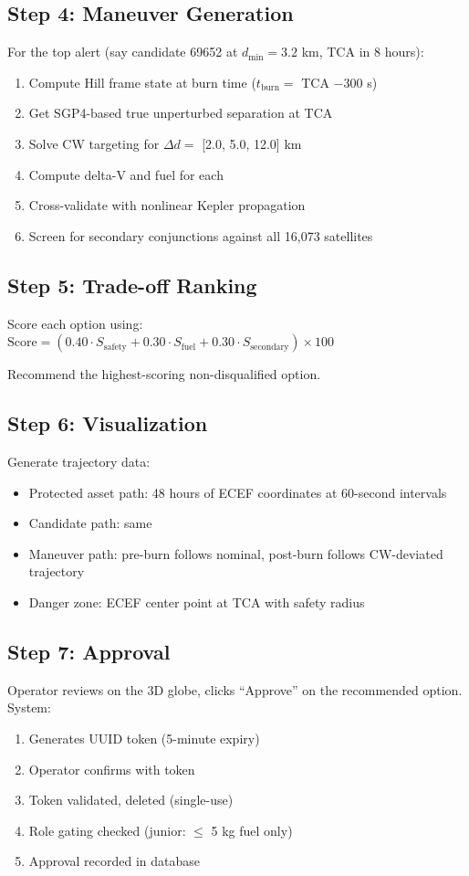 \documentclass[12pt,a4paper]{article}
\begin{document}
\subsection{Step 4: Maneuver Generation}
For the top alert (say candidate 69652 at $d_{\min} = 3.2$ km, TCA in 8 hours):
\begin{enumerate}
    \item Compute Hill frame state at burn time ($t_{\text{burn}} = $ TCA $- 300$ s)
    \item Get SGP4-based true unperturbed separation at TCA
    \item Solve CW targeting for $\Delta d =$ [2.0, 5.0, 12.0] km
    \item Compute delta-V and fuel for each
    \item Cross-validate with nonlinear Kepler propagation
    \item Screen for secondary conjunctions against all 16,073 satellites
\end{enumerate}

\subsection{Step 5: Trade-off Ranking}
Score each option using: $\text{Score} = (0.40 \cdot S_{\text{safety}} + 0.30 \cdot S_{\text{fuel}} + 0.30 \cdot S_{\text{secondary}}) \times 100$

Recommend the highest-scoring non-disqualified option.

\subsection{Step 6: Visualization}
Generate trajectory data:
\begin{itemize}
    \item Protected asset path: 48 hours of ECEF coordinates at 60-second intervals
    \item Candidate path: same
    \item Maneuver path: pre-burn follows nominal, post-burn follows CW-deviated trajectory
    \item Danger zone: ECEF center point at TCA with safety radius
\end{itemize}

\subsection{Step 7: Approval}
Operator reviews on the 3D globe, clicks ``Approve'' on the recommended option. System:
\begin{enumerate}
    \item Generates UUID token (5-minute expiry)
    \item Operator confirms with token
    \item Token validated, deleted (single-use)
    \item Role gating checked (junior: $\leq$ 5 kg fuel only)
    \item Approval recorded in database
\end{enumerate}
\end{document}
